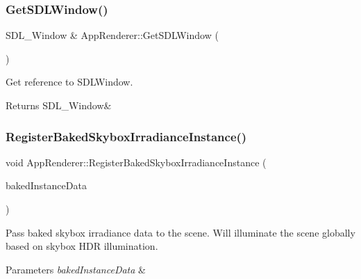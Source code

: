 \subsubsection{\texorpdfstring{Get\+S\+D\+L\+Window()}{GetSDLWindow()}}
{\footnotesize\ttfamily S\+D\+L\+\_\+\+Window \& App\+Renderer\+::\+Get\+S\+D\+L\+Window (\begin{DoxyParamCaption}{ }\end{DoxyParamCaption})}



Get reference to S\+D\+L\+Window. 

\begin{DoxyReturn}{Returns}
S\+D\+L\+\_\+\+Window\& 
\end{DoxyReturn}
\mbox{\label{classAppRenderer_a596152f75036dfc597666d3ead6e0959}} 
\subsubsection{\texorpdfstring{Register\+Baked\+Skybox\+Irradiance\+Instance()}{RegisterBakedSkyboxIrradianceInstance()}}
{\footnotesize\ttfamily void App\+Renderer\+::\+Register\+Baked\+Skybox\+Irradiance\+Instance (\begin{DoxyParamCaption}\item[{const \hyperlink{structBakedSkyboxIrradianceInstanceData}{Baked\+Skybox\+Irradiance\+Instance\+Data} \&}]{baked\+Instance\+Data }\end{DoxyParamCaption})}



Pass baked skybox irradiance data to the scene. Will illuminate the scene globally based on skybox H\+DR illumination. 


\begin{DoxyParams}{Parameters}
{\em baked\+Instance\+Data} & \\
\hline
\end{DoxyParams}
\mbox{\label{classAppRenderer_af7ca20884c77f5d17a59835742611803}} 
